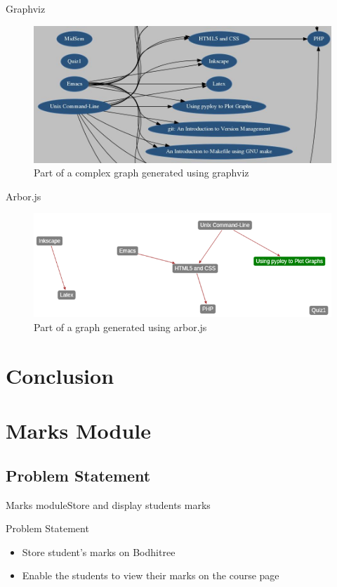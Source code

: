 \documentclass{beamer}
\begin{document}
\begin{frame}{Graphviz}
	\begin{figure}
		\centering
		\includegraphics[width=0.8\linewidth]{media/Graphviz}
		\caption{Part of a complex graph generated using graphviz}
		\label{fig:Graphviz}
	\end{figure}
\end{frame}

\begin{frame}{Arbor.js}
	\begin{figure}
		\centering
		\includegraphics[width=0.8\linewidth]{media/PrereqGraph}
		\caption{Part of a graph generated using arbor.js}
		\label{fig:PrereqGraph}
	\end{figure}
\end{frame}

\section[]{Conclusion}

\section{Marks Module}

\subsection{Problem Statement}

\begin{frame}{Marks module}{Store and display students marks}
	\begin{block}{Problem Statement}
		\begin{itemize}
			\item Store student’s marks on Bodhitree
			\item Enable the students to view their marks on the course page
		\end{itemize}
	\end{block}
\end{frame}
\end{document}
